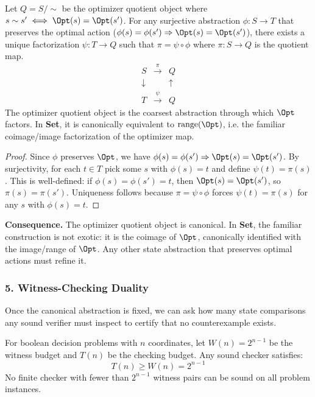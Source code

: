 \begin{theorem}\label{thm:quotient-universal}
Let $Q = S/{\sim}$ be the optimizer quotient object where $s \sim s' \iff \Opt(s) = \Opt(s')$. For any surjective abstraction $\phi: S \to T$ that preserves the optimal action ($\phi(s) = \phi(s') \Rightarrow \Opt(s) = \Opt(s')$), there exists a unique factorization $\psi: T \to Q$ such that $\pi = \psi \circ \phi$ where $\pi: S \to Q$ is the quotient map.
\[
  \begin{array}{ccc}
    S & \xrightarrow{\pi} & Q \\
    \downarrow & & \uparrow \\
    T & \xrightarrow{\psi} & Q
  \end{array}
\]
The optimizer quotient object is the coarsest abstraction through which $\Opt$ factors. In \textbf{Set}, it is canonically equivalent to $\operatorname{range}(\Opt)$, i.e. the familiar coimage/image factorization of the optimizer map.
\end{theorem}

\begin{proof}
Since $\phi$ preserves $\Opt$, we have $\phi(s) = \phi(s') \Rightarrow \Opt(s) = \Opt(s')$. By surjectivity, for each $t \in T$ pick some $s$ with $\phi(s) = t$ and define $\psi(t) = \pi(s)$. This is well-defined: if $\phi(s) = \phi(s') = t$, then $\Opt(s) = \Opt(s')$, so $\pi(s) = \pi(s')$. Uniqueness follows because $\pi = \psi \circ \phi$ forces $\psi(t) = \pi(s)$ for any $s$ with $\phi(s) = t$.
\end{proof}

\noindent\textbf{Consequence.} The optimizer quotient object is canonical. In \textbf{Set}, the familiar construction is not exotic: it is the coimage of $\Opt$, canonically identified with the image/range of $\Opt$. Any other state abstraction that preserves optimal actions must refine it.

\subsubsection{5. Witness-Checking Duality}

Once the canonical abstraction is fixed, we can ask how many state comparisons any sound verifier must inspect to certify that no counterexample exists.

\begin{theorem}\label{thm:checking-duality}
For boolean decision problems with $n$ coordinates, let $W(n) = 2^{n-1}$ be the witness budget and $T(n)$ be the checking budget. Any sound checker satisfies:
\[
  T(n) \geq W(n) = 2^{n-1}
\]
No finite checker with fewer than $2^{n-1}$ witness pairs can be sound on all problem instances.
\end{theorem}

